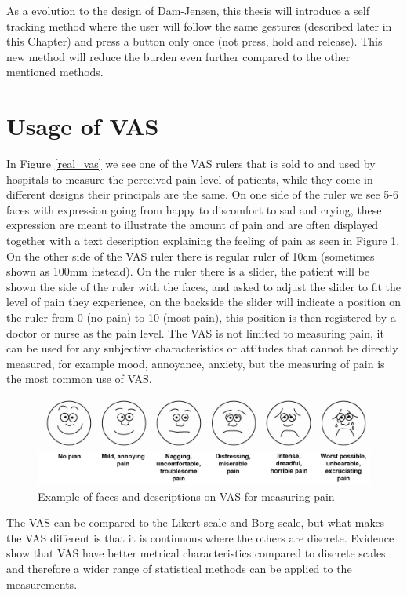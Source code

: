 As a evolution to the design of Dam-Jensen\cite{dam}, this thesis will introduce a self tracking method where the user will follow the same gestures (described later in this Chapter) and press a button only once (not press, hold and release). This new method will reduce the burden even further compared to the other mentioned methods.


\section{Usage of VAS}
In Figure \ref{real_vas} we see one of the VAS rulers that is sold to and used by hospitals to measure the perceived pain level of patients, while they come in different designs their principals are the same. On one side of the ruler we see 5-6 faces with expression going from happy to discomfort to sad and crying, these expression are meant to illustrate the amount of pain and are often displayed together with a text description explaining the feeling of pain as seen in Figure \ref{vas_faces}. On the other side of the VAS ruler there is regular ruler of 10cm (sometimes shown as 100mm instead). On the ruler there is a slider, the patient will be shown the side of the ruler with the faces, and asked to adjust the slider to fit the level of pain they experience, on the backside the slider will indicate a position on the ruler from 0 (no pain) to 10 (most pain), this position is then registered by a doctor or nurse as the pain level. The VAS is not limited to measuring pain, it can be used for any subjective characteristics or attitudes that cannot be directly measured, for example mood, annoyance, anxiety, but the measuring of pain is the most common use of VAS.

\begin{figure}[h!]
    \centering
    \includegraphics[width=1\textwidth]{figures/vas_faces.png}
    \caption{Example of faces and descriptions on VAS for measuring pain\cite{vas_faces}}
    \label{vas_faces}
\end{figure}

The VAS can be compared to the Likert scale and Borg scale\cite{borg_scale}, but what makes the VAS different is that it is continuous where the others are discrete. Evidence show that VAS have better metrical characteristics compared to discrete scales and therefore a wider range of statistical methods can be applied to the measurements\cite{best_scale}.

